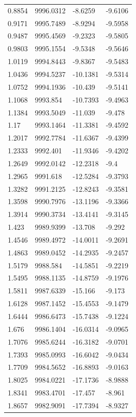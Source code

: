 \begin{table}[H]
\begin{tabular}{llll}
0.8854 & 9996.0312 & -8.6259 & -9.6106 \\
0.9171 & 9995.7489 & -8.9294 & -9.5958 \\
0.9487 & 9995.4569 & -9.2323 & -9.5805 \\
0.9803 & 9995.1554 & -9.5348 & -9.5646 \\
1.0119 & 9994.8443 & -9.8367 & -9.5483 \\
1.0436 & 9994.5237 & -10.1381 & -9.5314 \\
1.0752 & 9994.1936 & -10.439 & -9.5141 \\
1.1068 & 9993.854 & -10.7393 & -9.4963 \\
1.1384 & 9993.5049 & -11.039 & -9.478 \\
1.17 & 9993.1464 & -11.3381 & -9.4592 \\
1.2017 & 9992.7784 & -11.6367 & -9.4399 \\
1.2333 & 9992.401 & -11.9346 & -9.4202 \\
1.2649 & 9992.0142 & -12.2318 & -9.4 \\
1.2965 & 9991.618 & -12.5284 & -9.3793 \\
1.3282 & 9991.2125 & -12.8243 & -9.3581 \\
1.3598 & 9990.7976 & -13.1196 & -9.3366 \\
1.3914 & 9990.3734 & -13.4141 & -9.3145 \\
1.423 & 9989.9399 & -13.708 & -9.292 \\
1.4546 & 9989.4972 & -14.0011 & -9.2691 \\
1.4863 & 9989.0452 & -14.2935 & -9.2457 \\
1.5179 & 9988.584 & -14.5851 & -9.2219 \\
1.5495 & 9988.1135 & -14.8759 & -9.1976 \\
1.5811 & 9987.6339 & -15.166 & -9.173 \\
1.6128 & 9987.1452 & -15.4553 & -9.1479 \\
1.6444 & 9986.6473 & -15.7438 & -9.1224 \\
1.676 & 9986.1404 & -16.0314 & -9.0965 \\
1.7076 & 9985.6244 & -16.3182 & -9.0701 \\
1.7393 & 9985.0993 & -16.6042 & -9.0434 \\
1.7709 & 9984.5652 & -16.8893 & -9.0163 \\
1.8025 & 9984.0221 & -17.1736 & -8.9888 \\
1.8341 & 9983.4701 & -17.457 & -8.961 \\
1.8657 & 9982.9091 & -17.7394 & -8.9327 \\

\end{tabular}
\end{table}
